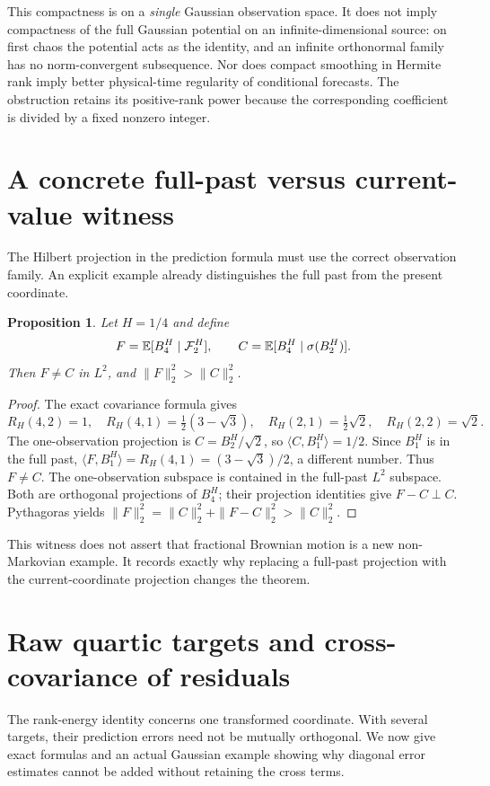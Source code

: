 \documentclass[11pt]{article}
\newtheorem{proposition}[theorem]{Proposition}
\begin{document}
This compactness is on a \emph{single} Gaussian observation space. It
does not imply compactness of the full Gaussian potential on an
infinite-dimensional source: on first chaos the potential acts as the
identity, and an infinite orthonormal family has no norm-convergent
subsequence. Nor does compact smoothing in Hermite rank imply better
physical-time regularity of conditional forecasts. The obstruction
retains its positive-rank power because the corresponding coefficient
is divided by a fixed nonzero integer.

\section{A concrete full-past versus current-value witness}
The Hilbert projection in the prediction formula must use the correct
observation family. An explicit example already distinguishes the full
past from the present coordinate.

\begin{proposition}\label{prop:memory}
Let $H=1/4$ and define
\[
 F=\mathbb E[B_4^H\mid\mathcal F_2^H],\qquad
 C=\mathbb E[B_4^H\mid\sigma(B_2^H)].
\]
Then $F\ne C$ in $L^2$, and $\|F\|_2^2>\|C\|_2^2$.
\end{proposition}
\begin{proof}
The exact covariance formula gives
\[
 R_H(4,2)=1,\quad R_H(4,1)=\tfrac12(3-\sqrt3),\quad
 R_H(2,1)=\tfrac12\sqrt2,\quad R_H(2,2)=\sqrt2.
\]
The one-observation projection is $C=B_2^H/\sqrt2$, so
$\langle C,B_1^H\rangle=1/2$. Since $B_1^H$ is in the full past,
$\langle F,B_1^H\rangle=R_H(4,1)=(3-\sqrt3)/2$, a different number.
Thus $F\ne C$. The one-observation subspace is contained in the
full-past $L^2$ subspace. Both are orthogonal projections of $B_4^H$;
their projection identities give $F-C\perp C$. Pythagoras yields
$\|F\|_2^2=\|C\|_2^2+\|F-C\|_2^2>\|C\|_2^2$.
\end{proof}

This witness does not assert that fractional Brownian motion is a new
non-Markovian example. It records exactly why replacing a full-past
projection with the current-coordinate projection changes the theorem.

\section{Raw quartic targets and cross-covariance of residuals}
The rank-energy identity concerns one transformed coordinate. With several
targets, their prediction errors need not be mutually orthogonal. We now
give exact formulas and an actual Gaussian example showing why diagonal
error estimates cannot be added without retaining the cross terms.
\end{document}
